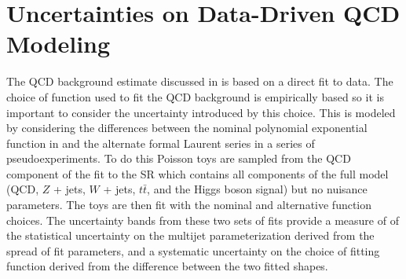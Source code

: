 \section{Uncertainties on Data-Driven QCD Modeling} \label{sec:systematics:qcd_modeling}

The QCD background estimate discussed in  is based on
a direct fit to data. The choice of function used to fit the QCD background is
empirically based so it is important to consider the uncertainty introduced by
this choice.  This is modeled by considering the differences between the
nominal polynomial exponential function in  and
the alternate formal Laurent series  in a series
of pseudoexperiments.  To do this Poisson toys are sampled from the QCD
component of the fit to the SR which contains all components of the full model
(QCD, $Z$ + jets, $W$ + jets, $t\bar{t}$, and the Higgs boson signal) but no
nuisance parameters. The toys are then fit with the nominal and alternative
function choices.  The uncertainty bands from these two sets of fits provide a
measure of of the statistical uncertainty on the multijet parameterization
derived from the spread of fit parameters, and a systematic uncertainty on the
choice of fitting function derived from the difference between the two fitted
shapes.

